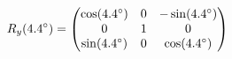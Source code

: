 \documentclass[preview]{standalone}
\begin{document}
\begin{align*}
\special{dvisvgm:raw <g id='unique000'>}R_y(4.4^\circ) = \begin{pmatrix} \cos(4.4^\circ) & 0 & -\sin(4.4^\circ) \\ 0 & 1 & 0 \\ \sin(4.4^\circ) & 0 & \cos(4.4^\circ) \end{pmatrix}\special{dvisvgm:raw </g>}
\end{align*}
\end{document}
